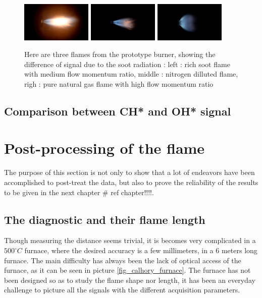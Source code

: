 \begin{figure}[!h]
  \centering
\includegraphics[width=0.3\textwidth]
{fig/soot/soot_rich.jpg}
 \includegraphics[width=0.3\textwidth]
 {fig/soot/high_N2.jpg}
  \includegraphics[width=0.3\textwidth]
 {fig/soot/high_M.jpg}
  \caption{Here are three flames from the prototype burner, showing the difference of signal due to the soot radiation : left :  rich soot flame with medium flow momentum ratio, middle : nitrogen dilluted flame, righ : pure natural gas flame with high flow momentum ratio }
 \label{fig_comparison_soot}
\end{figure}
\subsection{Comparison between CH* and OH* signal}

\section{Post-processing of the flame}

The purpose of this section is not only to show that a lot of endeavors have been accomplished to post-treat the data, but also to prove the 
reliability of the results to be given in the next chapter  \# ref chapter!!!!. 
\subsection{The diagnostic and their flame length}

Though measuring the distance seems trivial, it is becomes very complicated in a $500^\circ C$  furnace, where the desired accuracy is a few millimeters, in a 6 meters long furnace. The main difficulty has always been the lack of optical access of the furnace, as it can be seen in picture \ref{fig_calhory_furnace}. The furnace has not been designed so as to study the flame shape nor length, it has been an everyday challenge to picture all the signals with the different acquisition parameters.


